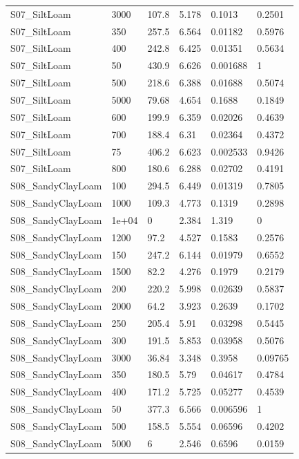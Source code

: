 {\begin{longtable}
{}S07\_SiltLoam & 3000 & 107.8 & 5.178 & 0.1013 & 0.2501\\
{}S07\_SiltLoam & 350 & 257.5 & 6.564 & 0.01182 & 0.5976\\
{}S07\_SiltLoam & 400 & 242.8 & 6.425 & 0.01351 & 0.5634\\
{}S07\_SiltLoam & 50 & 430.9 & 6.626 & 0.001688 & 1\\
{}S07\_SiltLoam & 500 & 218.6 & 6.388 & 0.01688 & 0.5074\\
{}S07\_SiltLoam & 5000 & 79.68 & 4.654 & 0.1688 & 0.1849\\
{}S07\_SiltLoam & 600 & 199.9 & 6.359 & 0.02026 & 0.4639\\
{}S07\_SiltLoam & 700 & 188.4 & 6.31 & 0.02364 & 0.4372\\
{}S07\_SiltLoam & 75 & 406.2 & 6.623 & 0.002533 & 0.9426\\
{}S07\_SiltLoam & 800 & 180.6 & 6.288 & 0.02702 & 0.4191\\
{}S08\_SandyClayLoam & 100 & 294.5 & 6.449 & 0.01319 & 0.7805\\
{}S08\_SandyClayLoam & 1000 & 109.3 & 4.773 & 0.1319 & 0.2898\\
{}S08\_SandyClayLoam & 1e+04 & 0 & 2.384 & 1.319 & 0\\
{}S08\_SandyClayLoam & 1200 & 97.2 & 4.527 & 0.1583 & 0.2576\\
{}S08\_SandyClayLoam & 150 & 247.2 & 6.144 & 0.01979 & 0.6552\\
{}S08\_SandyClayLoam & 1500 & 82.2 & 4.276 & 0.1979 & 0.2179\\
{}S08\_SandyClayLoam & 200 & 220.2 & 5.998 & 0.02639 & 0.5837\\
{}S08\_SandyClayLoam & 2000 & 64.2 & 3.923 & 0.2639 & 0.1702\\
{}S08\_SandyClayLoam & 250 & 205.4 & 5.91 & 0.03298 & 0.5445\\
{}S08\_SandyClayLoam & 300 & 191.5 & 5.853 & 0.03958 & 0.5076\\
{}S08\_SandyClayLoam & 3000 & 36.84 & 3.348 & 0.3958 & 0.09765\\
{}S08\_SandyClayLoam & 350 & 180.5 & 5.79 & 0.04617 & 0.4784\\
{}S08\_SandyClayLoam & 400 & 171.2 & 5.725 & 0.05277 & 0.4539\\
{}S08\_SandyClayLoam & 50 & 377.3 & 6.566 & 0.006596 & 1\\
{}S08\_SandyClayLoam & 500 & 158.5 & 5.554 & 0.06596 & 0.4202\\
{}S08\_SandyClayLoam & 5000 & 6 & 2.546 & 0.6596 & 0.0159\\

\end{longtable}}
